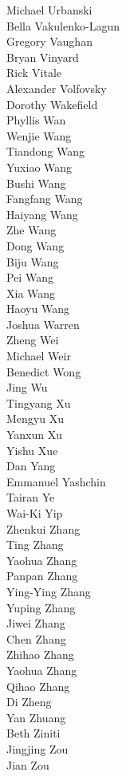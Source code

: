 Michael Urbanski\\
Bella Vakulenko-Lagun\\
Gregory Vaughan\\
Bryan Vinyard\\
Rick Vitale\\
Alexander Volfovsky\\
Dorothy Wakefield\\
Phyllis Wan\\
Wenjie Wang\\
Tiandong Wang\\
Yuxiao Wang\\
Bushi Wang\\
Fangfang Wang\\
Haiyang Wang\\
Zhe Wang\\
Dong Wang\\
Biju Wang\\
Pei Wang\\
Xia Wang\\
Haoyu Wang\\
Joshua Warren\\
Zheng Wei\\
Michael Weir\\
Benedict Wong\\
Jing Wu\\
Tingyang Xu\\
Mengyu Xu\\
Yanxun Xu\\
Yishu Xue\\
Dan Yang\\
Emmanuel Yashchin\\
Tairan Ye\\
Wai-Ki Yip\\
Zhenkui Zhang\\
Ting Zhang\\
Yaohua  Zhang\\
Panpan Zhang\\
Ying-Ying Zhang\\
Yuping Zhang\\
Jiwei Zhang\\
Chen Zhang\\
Zhihao Zhang\\
Yaohua Zhang\\
Qihao Zhang\\
Di Zheng\\
Yan Zhuang\\
Beth Ziniti\\
Jingjing Zou\\
Jian Zou\\

